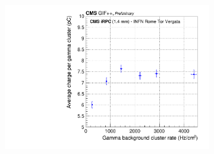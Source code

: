 \begin{figure}[H]
\begin{subfigure}{.5\linewidth}
			\includegraphics[width = \linewidth]{fig/chapt6/CMS-iRPC-INFN-GammaCharge_vs_Rate.pdf}
			\caption{\label{fig:iRPC_INFN_clust:C}}
		\end{subfigure}
		\caption{\label{fig:iRPC_INFN_clust} }
    \end{figure}

\clearpage{\pagestyle{empty}\cleardoublepage}